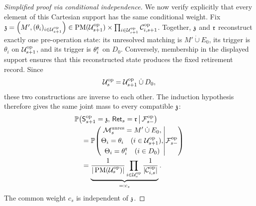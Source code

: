 {\begin{proof}[Simplified proof via conditional independence]
We now verify explicitly that every element of this Cartesian support has
the same conditional weight.  Fix
\(
 \mathfrak z
 =\left(M',(\theta_i)_{i\in\mathcal U^{\mathrm{op}}_{s+1}}\right)
 \in
 \operatorname{PM}(\mathcal U^{\mathrm{op}}_{s+1})
 \times
 \prod_{i\in\mathcal U^{\mathrm{op}}_{s+1}}
       \mathcal C^{\mathrm{op}}_{i,s+1}
\).
Together, \(\mathfrak z\) and \(\mathfrak r\) reconstruct exactly one
pre-operation state: its unresolved matching is
\(M'\mathbin{\dot\cup}E_0\), its trigger is \(\theta_i\) on
\(\mathcal U^{\mathrm{op}}_{s+1}\), and its trigger is
\(\theta_i^{\mathfrak r}\) on \(D_0\).  Conversely, membership in the
displayed support ensures that this reconstructed state produces the fixed
retirement record.  Since
\[
 \mathcal U^{\mathrm{op}}_{s}
 =\mathcal U^{\mathrm{op}}_{s+1}\mathbin{\dot\cup}D_0,
\]
these two constructions are inverse to each other.  The induction hypothesis
therefore gives the same joint mass to every compatible
\(\mathfrak z\):
\[
\begin{aligned}
 &\mathbb P\!\left(
   \mathsf S^{\mathrm{op}}_{s+1}=\mathfrak z,\,
   \mathsf{Ret}_{s}=\mathfrak r
   \,\middle|\,\mathcal F^{\mathrm{op}}_{s-}\right)\\
 &\quad=
 \mathbb P\!\left(
 \begin{gathered}
  \mathcal M_{s}^{\mathrm{unres}}=M'\mathbin{\dot\cup}E_0,\\
  \Theta_{i}=\theta_i
       \quad(i\in\mathcal U^{\mathrm{op}}_{s+1}),\\
  \Theta_{i}=\theta_i^{\mathfrak r}\quad(i\in D_0)
 \end{gathered}
 \middle|\mathcal F^{\mathrm{op}}_{s-}\right)\\
 &\quad=
 \underbrace{
 \frac{1}{|\operatorname{PM}(\mathcal U^{\mathrm{op}}_{s})|}
 \prod_{i\in\mathcal U^{\mathrm{op}}_{s}}
       \frac{1}{|\mathcal C^{\mathrm{op}}_{i,s}|}
 }_{=:c_s}.
\end{aligned}
\]
The common weight \(c_s\) is independent of \(\mathfrak z\).


\end{proof}}
